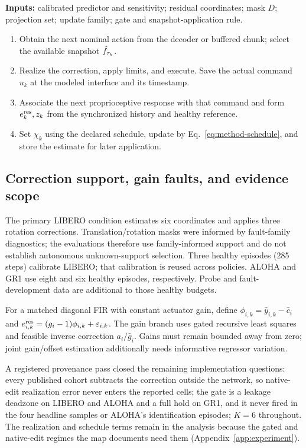 \begin{algorithm}[H]
\centering\small
\begin{minipage}{.97\linewidth}
\textbf{Inputs:} calibrated predictor and sensitivity; residual coordinates;
mask $D$; projection set; update family; gate and snapshot-application rule.
\begin{enumerate}[leftmargin=1.5em,itemsep=1pt,topsep=3pt]
\item Obtain the next nominal action from the decoder or buffered chunk;
select the available snapshot $\hat f_{\tau_k}$.
\item Realize the correction, apply limits, and execute. Save the actual
command $u_k$ at the modeled interface and its timestamp.
\item Associate the next proprioceptive response with that command and form
$e_k^{\rm res},z_k$ from the synchronized history and healthy reference.
\item Set $\chi_k$ using the declared schedule, update by
Eq.~\eqref{eq:method-schedule}, and store the estimate for later application.
\end{enumerate}
\end{minipage}
\caption{Causal execution semantics used in the analysis. Fault truth is
unavailable to the deployment estimator. The observed update/hold and
application schedules must be logged to instantiate the schedule bounds.}
\label{alg:execution}
\end{algorithm}

\subsection{Correction support, gain faults, and evidence scope}
The primary LIBERO condition estimates six coordinates and applies three
rotation corrections. Translation/rotation masks were informed by fault-family
diagnostics; the evaluations therefore use family-informed support and do
not establish autonomous unknown-support selection. Three healthy episodes
(285 steps) calibrate LIBERO; that calibration is reused across policies.
ALOHA and GR1 use eight and six healthy episodes, respectively. Probe and
fault-development data are additional to those healthy budgets.

For a matched diagonal FIR with constant actuator gain, define
$\phi_{i,k}=\widehat y_{i,k}-\widehat c_i$ and
$e_{i,k}^{\rm res}=(g_i-1)\phi_{i,k}+\varepsilon_{i,k}$. The gain branch uses gated
recursive least squares and feasible inverse correction $a_i/\widehat g_i$.
Gains must remain bounded away from zero; joint gain/offset estimation
additionally needs informative regressor variation.

A registered provenance pass closed the remaining implementation
questions: every published cohort subtracts the correction outside the
network, so native-edit realization error never enters the reported cells;
the gate is a leakage deadzone on LIBERO and ALOHA and a full hold on GR1,
and it never fired in the four headline samples or ALOHA's identification
episodes; $K=6$ throughout. The realization and schedule terms remain in the
analysis because the gated and native-edit regimes the map documents need
them (Appendix~\ref{app:experiment}).
